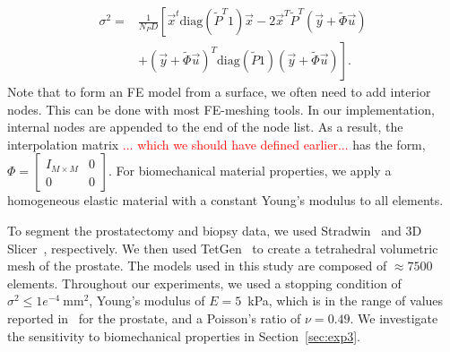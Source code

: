 \documentclass[journal]{IEEEtran}
\newcommand{\comment}[1]{\textcolor{red}{#1}}
\newcommand{\diag}{\mathrm{diag}}
\begin{document}
\begin{align} 
\sigma^2 = & \frac{1}{N_PD}\left[\vec{x}^t\diag\!\left(\tilde{P}^T1\right)\vec{x} -2\vec{x}^T\tilde{P}^T(\vec{y}+\tilde{\Phi}\vec{u})\right.\nonumber\\
  & \left.+(\vec{y}+\tilde{\Phi}\vec{u})^T\diag\!\left(\tilde{P}1\right)(\vec{y}+\tilde{\Phi}\vec{u})\right]. \label{eq:estep2}
\end{align}
Note that to form an FE model from a surface, we often need to add interior nodes. This can be done with most FE-meshing tools. In our implementation, internal nodes are appended to the end of the node list. As a result, the interpolation matrix \comment{... which we should have defined earlier...} has the form, $\Phi=\begin{bmatrix} I_{M\times M} & 0\\ 0 & 0 \end{bmatrix}$. For biomechanical material properties, we apply a homogeneous elastic material with a constant Young's modulus to all elements.

To segment the prostatectomy and biopsy data, we used Stradwin~\cite{Treece00a} and 3D Slicer~\cite{Fedorov12a}, respectively. We then used TetGen~\cite{Si06a} to create a tetrahedral volumetric mesh of the prostate.  The models used in this study are composed of $\approx7500$ elements. Throughout our experiments, we used a stopping condition of $\sigma^2\leq1e^{-4}~\mathrm{mm}^2$, Young's modulus of $E=5$~kPa, which is in the range of values reported in~\cite{Kemper04a} for the prostate, and a Poisson's ratio of $\nu=0.49$. We investigate the sensitivity to biomechanical properties in Section~\ref{sec:exp3}.

\end{document}
